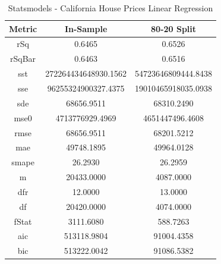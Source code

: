 \documentclass{article}
\begin{document}
\begin{table}[H]
\centering
\caption{Statsmodels - California House Prices Linear Regression}
\label{tab:Statsmodels - House Prices Linear Regression}
\begin{tabular}{|c|c|c|}\hline
Metric & In-Sample & 80-20 Split \\ \hline \hline
rSq & 0.6465 & 0.6526 \\ \hline
rSqBar & 0.6463 & 0.6516 \\ \hline
sst & 272264434648930.1562 & 54723646809444.8438 \\ \hline
sse & 96255324900327.4375 & 19010465918035.0938 \\ \hline
sde & 68656.9511 & 68310.2490 \\ \hline
mse0 & 4713776929.4969 & 4651447496.4608 \\ \hline
rmse & 68656.9511 & 68201.5212 \\ \hline
mae & 49748.1895 & 49964.0128 \\ \hline
smape & 26.2930 & 26.2959 \\ \hline
m & 20433.0000 & 4087.0000 \\ \hline
dfr & 12.0000 & 13.0000 \\ \hline
df & 20420.0000 & 4074.0000 \\ \hline
fStat & 3111.6080 & 588.7263 \\ \hline
aic & 513118.9804 & 91004.4358 \\ \hline
bic & 513222.0042 & 91086.5382 \\ \hline
\end{tabular}
\end{table}
\end{document}
